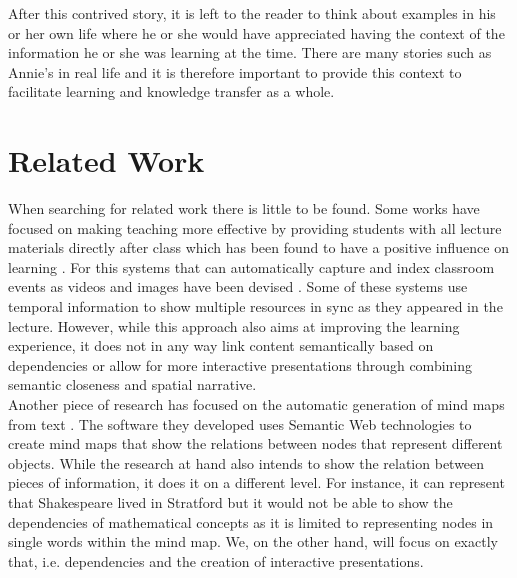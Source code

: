 \documentclass[twoside, 12pt]{article}
\begin{document}
After this contrived story, it is left to the reader to think about examples in his or her own life where he or she would have appreciated having the context of the information he or she was learning at the time. There are many stories such as Annie's in real life and it is therefore important to provide this context to facilitate learning and knowledge transfer as a whole. \\






\section{Related Work}
\label{sec:relatedworks}

When searching for related work there is little to be found. Some works have focused on making teaching more effective by providing students with all lecture materials directly after class which has been found to have a positive influence on learning \cite{DBLP:dblp_journals/tochi/BrothertonA04}. For this systems that can automatically capture and index classroom events as videos and images have been devised \cite{indexedclass:npentrel14}. Some of these systems use temporal information \cite{DBLP:dblp_journals/isci/ChungS97} to show multiple resources in sync as they appeared in the lecture. However, while this approach also aims at improving the learning experience, it does not in any way link content semantically based on dependencies or allow for more interactive presentations through combining semantic closeness and spatial narrative.\\

Another piece of research has focused on the automatic generation of mind maps from text \cite{abdeen2009direct}. The software they developed uses Semantic Web technologies to create mind maps that show the relations between nodes that represent different objects. While the research at hand also intends to show the relation between pieces of information, it does it on a different level. For instance, it can represent that Shakespeare lived in Stratford but it would not be able to show the dependencies of mathematical concepts as it is limited to representing nodes in single words within the mind map. We, on the other hand, will focus on exactly that, i.e. dependencies and the creation of interactive presentations.\\
\end{document}
